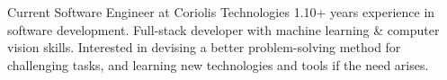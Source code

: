 
\begin{cvparagraph}

Current Software Engineer at Coriolis Technologies 1.10+ years experience in software development. Full-stack developer with machine learning \& computer vision skills. Interested in devising a better problem-solving method for challenging tasks, and learning new technologies and tools if the need arises.
\end{cvparagraph}
